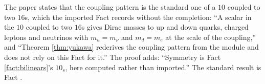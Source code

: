 The paper states that the coupling pattern is the standard one of a $10$ coupled to two $16$s, which the imported Fact records without the completion: ``A scalar in the $10$ coupled to two $16$s gives Dirac masses to up and down quarks, charged leptons and neutrinos with $m_{u} = m_{\nu}$ and $m_{d} = m_{e}$ at the scale of the coupling,'' and ``Theorem \ref{thm:yukawa} rederives the coupling pattern from the module and does not rely on this Fact for it.'' The proof adds: ``Symmetry is Fact \ref{fact:bilinears}'s $10_{s}$, here computed rather than imported.'' The standard result is Fact .
